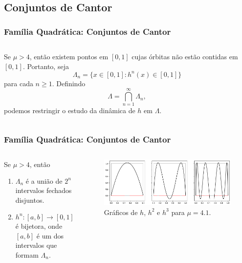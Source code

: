 \subsection{Conjuntos de Cantor}

\begin{frame}
\vspace{5pt}
\frametitle{Família Quadrática: Conjuntos de Cantor}
\begin{columns}
\column{\dimexpr\paperwidth-15pt}

Se $\mu > 4$, então existem pontos em $[0, 1]$ cujas órbitas não estão contidas em $[0, 1]$. Portanto, seja
$$\Lambda_n = \lbrace x \in [0, 1] : h^n(x) \in [0, 1] \rbrace$$ 
para cada $n \geq 1$. Definindo
$$\Lambda =  \bigcap_{n = 1}^\infty \Lambda_n,$$
podemos restringir o estudo da dinâmica de $h$ em $\Lambda$.

\end{columns}
\end{frame}


\begin{frame}
\frametitle{Família Quadrática: Conjuntos de Cantor}
\begin{columns}
\column{\dimexpr\paperwidth-15pt}

\begin{proposition}
Se $\mu > 4$, então
\begin{enumerate}
\item $\Lambda_n$ é a união de $2^n$ intervalos fechados disjuntos.
\item $h^n: [a, b] \to [0, 1]$ é bijetora, onde $[a, b]$ é um dos intervalos que formam $\Lambda_n$.
\end{enumerate}
\end{proposition}

\begin{figure}[!htb]
\centering
\includegraphics[scale=0.4]{images/h_4,1.png}
\caption{Gráficos de $h$, $h^2$ e $h^3$ para $\mu = 4.1$.}
\label{h_3,839}
\end{figure}

\end{columns}
\end{frame}

